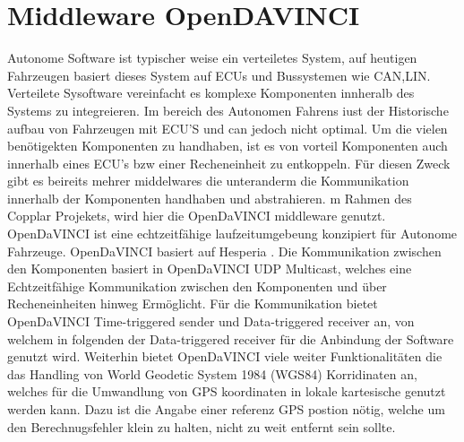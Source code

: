 \section{Middleware OpenDAVINCI}
Autonome Software ist typischer weise ein verteiletes System, auf heutigen Fahrzeugen basiert dieses System auf ECUs und Bussystemen wie CAN,LIN.
Verteilete Sysoftware vereinfacht es komplexe Komponenten innheralb des Systems zu integreieren. Im bereich des Autonomen Fahrens iust der Historische aufbau von Fahrzeugen
mit ECU'S und can jedoch nicht optimal. Um die vielen benötigekten Komponenten zu handhaben, ist es von vorteil Komponenten auch innerhalb eines ECU's bzw einer Recheneinheit
zu entkoppeln. Für diesen Zweck gibt es beireits mehrer middelwares die unteranderm die Kommunikation innerhalb der Komponenten handhaben und abstrahieren.
m Rahmen des Copplar Projekets, wird hier die OpenDaVINCI middleware genutzt. OpenDaVINCI ist eine echtzeitfähige laufzeitumgebeung konzipiert für Autonome Fahrzeuge.
OpenDaVINCI basiert auf Hesperia \cite{Berger2010}. Die Kommunikation zwischen den Komponenten basiert in OpenDaVINCI UDP Multicast, welches eine Echtzeitfähige Kommunikation zwischen
den Komponenten  \cite{Kurose2013} und über Recheneinheiten hinweg Ermöglicht. Für die Kommunikation bietet OpenDaVINCI Time-triggered sender und Data-triggered receiver an, von welchem in folgenden der Data-triggered receiver
für die Anbindung der Software genutzt wird. Weiterhin bietet OpenDaVINCI viele weiter Funktionalitäten die das Handling von World Geodetic System 1984 (WGS84) Korridinaten an, welches für die Umwandlung
von GPS koordinaten in lokale kartesische genutzt werden kann. Dazu ist die Angabe einer referenz GPS postion nötig, welche um den Berechnugsfehler klein zu halten,
nicht zu weit entfernt sein sollte.






